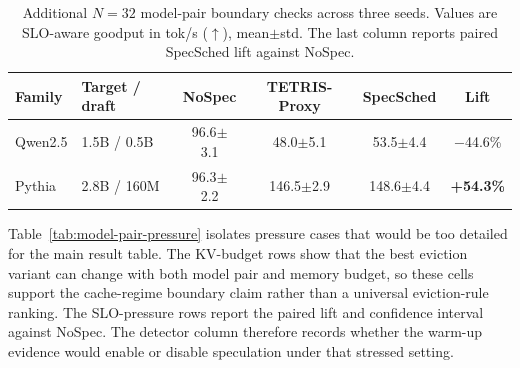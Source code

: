 \documentclass[10pt,journal,onecolumn]{IEEEtran}
\newcommand{\pos}[1]{\textcolor{green!50!black}{{\bfseries #1}}}
\newcommand{\bad}[1]{\textcolor{red!70!black}{#1}}
\newcommand{\system}{SpecSched}
\begin{document}
\begin{table}[t]
\centering
\caption{Additional $N=32$ model-pair boundary checks across three seeds. Values are SLO-aware goodput in tok/s ($\uparrow$), mean$\pm$std. The last column reports paired \system{} lift against NoSpec.}
\label{tab:model-pair-n32}
\scriptsize
\setlength{\tabcolsep}{2.8pt}
\renewcommand{\arraystretch}{1.12}
\begin{tabular}{@{}p{}p{}cccc@{}}
\toprule
Family & Target / draft & NoSpec & TETRIS-Proxy & \system{} & Lift \\
\midrule
Qwen2.5 & 1.5B / 0.5B & 96.6$\pm$3.1 & 48.0$\pm$5.1 & 53.5$\pm$4.4 & \bad{$-$44.6\%} \\
Pythia~\cite{biderman2023pythia} & 2.8B / 160M & 96.3$\pm$2.2 & 146.5$\pm$2.9 & 148.6$\pm$4.4 & \pos{+54.3\%} \\
\bottomrule
\end{tabular}
\vspace{-0.5em}
\end{table}

Table~\ref{tab:model-pair-pressure} isolates pressure cases that would
be too detailed for the main result table. The KV-budget rows show that
the best eviction variant can change with both model pair and memory
budget, so these cells support the cache-regime boundary claim rather
than a universal eviction-rule ranking. The SLO-pressure rows report the
paired lift and confidence interval against NoSpec. The detector column
therefore records whether the warm-up evidence would enable or disable
speculation under that stressed setting.
\end{document}
